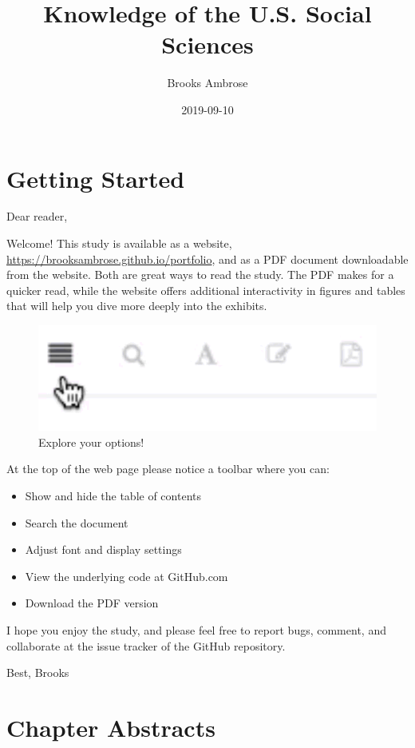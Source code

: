 \documentclass[]{book}
\title{Knowledge of the U.S. Social Sciences}
\author{Brooks Ambrose}
\date{2019-09-10}
\providecommand{\tightlist}{%
  \setlength{\itemsep}{0pt}\setlength{\parskip}{0pt}}
\theoremstyle{definition}
\theoremstyle{definition}
\theoremstyle{definition}
\theoremstyle{remark}
\begin{document}
\maketitle

{
\setcounter{tocdepth}{2}
\tableofcontents
}
\listoftables
\listoffigures
\hypertarget{getting-started}{%
\chapter*{Getting Started}\label{getting-started}}


Dear reader,

Welcome! This study is available as a website,
\url{https://brooksambrose.github.io/portfolio}, and as a PDF document
downloadable from the website. Both are great ways to read the study.
The PDF makes for a quicker read, while the website offers additional
interactivity in figures and tables that will help you dive more deeply
into the exhibits.

\begin{figure}

{\centering \includegraphics[width=0.3\linewidth]{img/toolbar} 

}

\caption{Explore your options!}\label{fig:toolbar}
\end{figure}

At the top of the web page please notice a toolbar where you can:

\begin{itemize}
\tightlist
\item
  Show and hide the table of contents
\item
  Search the document
\item
  Adjust font and display settings
\item
  View the underlying code at GitHub.com
\item
  Download the PDF version
\end{itemize}

I hope you enjoy the study, and please feel free to report bugs,
comment, and collaborate at the issue tracker of the GitHub repository.

Best, Brooks

\hypertarget{chapter-abstracts}{%
\chapter*{Chapter Abstracts}\label{chapter-abstracts}}
\end{document}

